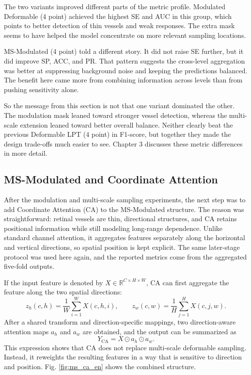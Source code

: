 \documentclass[a4paper,12pt]{article}
\begin{document}
The two variants improved different parts of the metric profile. Modulated Deformable (4 point) achieved the highest SE and AUC in this group, which points to better detection of thin vessels and weak responses. The extra mask seems to have helped the model concentrate on more relevant sampling locations.

MS-Modulated (4 point) told a different story. It did not raise SE further, but it did improve SP, ACC, and PR. That pattern suggests the cross-level aggregation was better at suppressing background noise and keeping the predictions balanced. The benefit here came more from combining information across levels than from pushing sensitivity alone.

So the message from this section is not that one variant dominated the other. The modulation mask leaned toward stronger vessel detection, whereas the multi-scale extension leaned toward better overall balance. Neither clearly beat the previous Deformable LPT (4 point) in F1-score, but together they made the design trade-offs much easier to see. Chapter 3 discusses these metric differences in more detail.

\subsection{MS-Modulated and Coordinate Attention}

After the modulation and multi-scale sampling experiments, the next step was to add Coordinate Attention (CA) \cite{hou2021coordatt} to the MS-Modulated structure. The reason was straightforward: retinal vessels are thin, directional structures, and CA retains positional information while still modeling long-range dependence. Unlike standard channel attention, it aggregates features separately along the horizontal and vertical directions, so spatial position is kept explicit. The same later-stage protocol was used here again, and the reported metrics come from the aggregated five-fold outputs.

If the input feature is denoted by \(X \in \mathbb{R}^{C\times H\times W}\), CA can first aggregate the feature along the two spatial directions:
\[
z_h(c,h)=\frac{1}{W}\sum_{i=1}^{W}X(c,h,i),\qquad
z_w(c,w)=\frac{1}{H}\sum_{j=1}^{H}X(c,j,w).
\]
After a shared transform and direction-specific mappings, two direction-aware attention maps \(a_h\) and \(a_w\) are obtained, and the output can be summarized as
\[
Y_{\mathrm{CA}} = X \odot a_h \odot a_w.
\]
This expression shows that CA does not replace multi-scale deformable sampling. Instead, it reweights the resulting features in a way that is sensitive to direction and position. Fig. \ref{fig:ms_ca_en} shows the combined structure.
\end{document}
